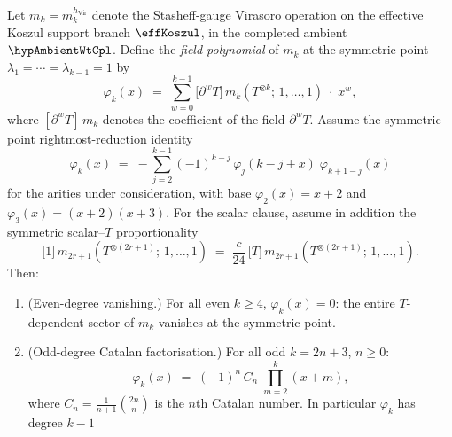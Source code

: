 \begin{theorem}
\label{thm:period-2-parity}%
%
%
%
%
%
Let \(m_k=m_k^{h_{\mathrm{Vir}}}\) denote the Stasheff-gauge
Virasoro operation on the effective Koszul support branch
\(\effKoszul\), in the completed ambient
\(\hypAmbientWtCpl\). Define the \emph{field polynomial} of
$m_k$ at the symmetric
point $\lambda_1 = \cdots = \lambda_{k-1} = 1$ by
\begin{equation}\label{eq:field-polynomial-def}
\varphi_k(x)
\;=\;
\sum_{w=0}^{k-1}
\bigl[\partial^w T\bigr]\,
m_k(T^{\otimes k};\,1,\ldots,1)
\;\cdot\;x^w,
\end{equation}
where $[\partial^w T]\,m_k$ denotes the coefficient of the
field $\partial^w T$. Assume the symmetric-point
rightmost-reduction identity
\begin{equation}\label{eq:gravity-phi-recursion}
\varphi_k(x)
\;=\;
-\!\!\sum_{j=2}^{k-1}
(-1)^{k-j}\,
\varphi_j(k{-}j{+}x)\;\varphi_{k+1-j}(x)
\end{equation}
for the arities under consideration, with base
\(\varphi_2(x)=x+2\) and
\(\varphi_3(x)=(x+2)(x+3)\). For the scalar clause, assume in
addition the symmetric scalar--\(T\) proportionality
\begin{equation}\label{eq:symmetric-scalar-t-proportionality}
\bigl[1\bigr]\,m_{2r+1}(T^{\otimes(2r+1)};\,1,\ldots,1)
\;=\;
\frac{c}{24}\,
\bigl[T\bigr]\,m_{2r+1}(T^{\otimes(2r+1)};\,1,\ldots,1).
\end{equation}
Then:
\begin{enumerate}[label=\textup{(\roman*)}]
\item \textup{(Even-degree vanishing.)}
 For all even $k \ge 4$, $\varphi_k(x) = 0$:
 the entire $T$-dependent sector of $m_k$ vanishes at the
 symmetric point.
\item \textup{(Odd-degree Catalan factorisation.)}
 For all odd $k = 2n+3$, $n \ge 0$:
 \begin{equation}\label{eq:catalan-factorisation}
 \varphi_k(x)
 \;=\;
 (-1)^n\,C_n\;\prod_{m=2}^{k}(x + m),
 \end{equation}
 where $C_n = \frac{1}{n+1}\binom{2n}{n}$ is the $n$th
 Catalan number. In particular $\varphi_k$ has degree $k-1$

\end{enumerate}
\end{theorem}
